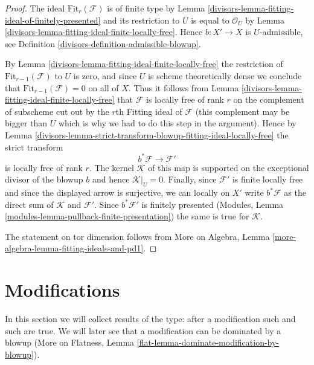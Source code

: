 \begin{proof}

The ideal $\text{Fit}_r(\mathcal{F})$ is of finite type
by Lemma \ref{divisors-lemma-fitting-ideal-of-finitely-presented}
and its restriction to $U$ is equal to $\mathcal{O}_U$ by
Lemma \ref{divisors-lemma-fitting-ideal-finite-locally-free}.
Hence $b : X' \to X$ is $U$-admissible, see
Definition \ref{divisors-definition-admissible-blowup}.

\medskip\noindent
By Lemma \ref{divisors-lemma-fitting-ideal-finite-locally-free}
the restriction of $\text{Fit}_{r - 1}(\mathcal{F})$
to $U$ is zero, and since $U$ is scheme theoretically dense
we conclude that $\text{Fit}_{r - 1}(\mathcal{F}) = 0$
on all of $X$. Thus it follows from
Lemma \ref{divisors-lemma-fitting-ideal-finite-locally-free}
that $\mathcal{F}$ is locally free of rank $r$
on the complement of subscheme cut out by the $r$th
Fitting ideal of $\mathcal{F}$ (this complement may
be bigger than $U$ which is why we had to do this step
in the argument). Hence by
Lemma \ref{divisors-lemma-strict-transform-blowup-fitting-ideal-locally-free}
the strict transform
$$
b^*\mathcal{F} \longrightarrow \mathcal{F}'
$$
is locally free of rank $r$. The kernel $\mathcal{K}$
of this map is supported on the exceptional divisor
of the blowup $b$ and hence $\mathcal{K}|_U = 0$.
Finally, since $\mathcal{F}'$ is finite locally free
and since the displayed arrow is surjective, we can
locally on $X'$ write $b^*\mathcal{F}$ as the
direct sum of $\mathcal{K}$ and $\mathcal{F}'$.
Since $b^*\mathcal{F}'$ is finitely presented
(Modules, Lemma \ref{modules-lemma-pullback-finite-presentation})
the same is true for $\mathcal{K}$.

\medskip\noindent
The statement on tor dimension follows from
More on Algebra, Lemma \ref{more-algebra-lemma-fitting-ideals-and-pd1}.
\end{proof}

\section{Modifications}
\label{divisors-section-modifications}
In this section we will collect results of the type: after a modification
such and such are true. We will later see that a modification can be
dominated by a blowup (More on Flatness, Lemma
\ref{flat-lemma-dominate-modification-by-blowup}).

